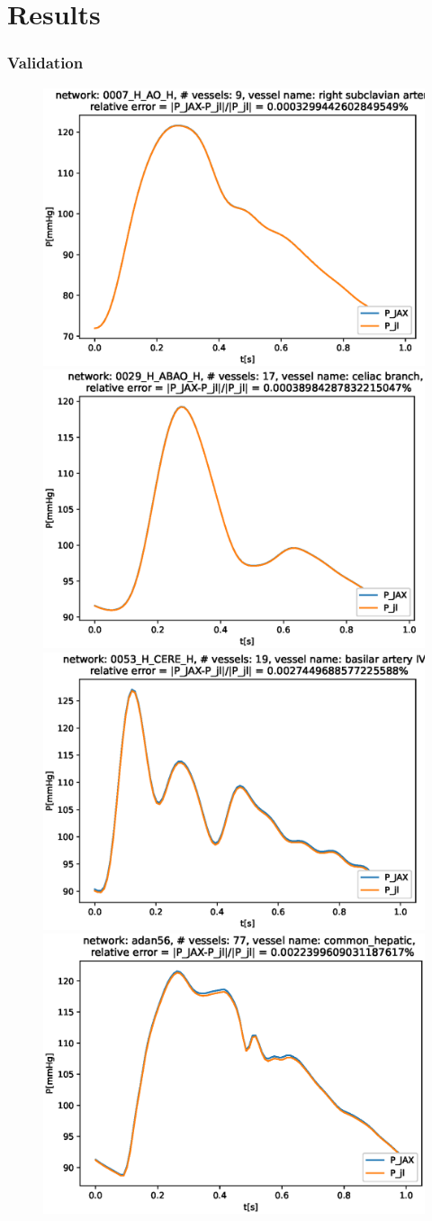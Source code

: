 \documentclass{beamer}
\begin{document}
	\section{Results}
	\begin{frame}
		\frametitle{Validation}
		\begin{figure} [H]
			\centering
			\includegraphics[width=0.46\columnwidth]{images/0007_H_AO_H_right_subclavian_artery_P.eps}
			\includegraphics[width=0.46\columnwidth]{images/0029_H_ABAO_H_celiac_branch_P.eps
			}
			\includegraphics[width=0.46\columnwidth]{images/0053_H_CERE_H_basilar_artery_IV_P.eps}
			\includegraphics[width=0.46\columnwidth]{images/adan56_common_hepatic_P.eps}
			\label{fig:val}
		\end{figure}
	\end{frame}
\end{document}
